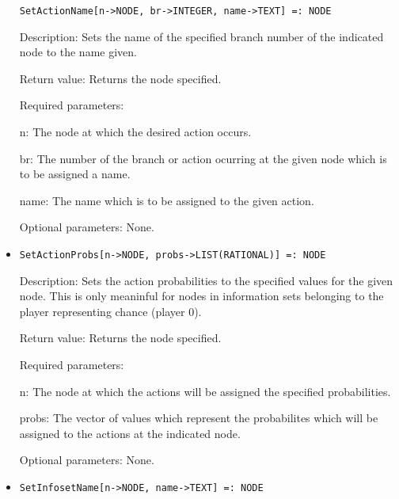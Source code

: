 \begin{itemize}
\protect \large \begin{verbatim}
SetActionName[n->NODE, br->INTEGER, name->TEXT] =: NODE
\end{verbatim}\normalsize

\bd
\item
[Description:] Sets the name of the specified branch number of the
indicated node to the name given.
\item
[Return value:] Returns the node specified.
\item
[Required parameters:]\hfil\null
	
\bd
\item
[n:] The node at which the desired action occurs.
\item
[br:] The number of the branch or action ocurring at the given node
which is to be assigned a name.
\item
[name:] The name which is to be assigned to the given action.
\ed

\item
[Optional parameters:] None.

\ed

\item

\protect \large \begin{verbatim}
SetActionProbs[n->NODE, probs->LIST(RATIONAL)] =: NODE
\end{verbatim}\normalsize

\bd
\item
[Description:] Sets the action probabilities to the specified values
for the given node.  This is only meaninful for nodes in information
sets belonging to the player representing chance (player 0).
\item
[Return value:] Returns the node specified.
\item
[Required parameters:]\hfil\null
	
\bd
\item
[n:] The node at which the actions will be assigned the specified
probabilities.
\item
[probs:] The vector of values which represent the probabilites which
will be assigned to the actions at the indicated node.
\ed

\item
[Optional parameters:] None.
\ed

\item

\protect \large \begin{verbatim}
SetInfosetName[n->NODE, name->TEXT] =: NODE
\end{verbatim}\normalsize


\end{itemize}
